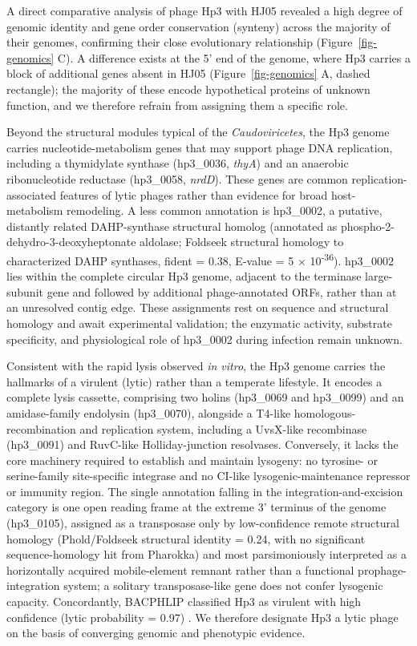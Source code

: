 A direct comparative analysis of phage Hp3 with HJ05 revealed a high
degree of genomic identity and gene order conservation (synteny) across
the majority of their genomes, confirming their close evolutionary
relationship (Figure~\ref{fig-genomics} C). A difference exists
at the 5' end of the genome, where Hp3 carries a block of additional
genes absent in HJ05 (Figure~\ref{fig-genomics} A, dashed rectangle);
the majority of these encode hypothetical proteins of unknown function,
and we therefore refrain from assigning them a specific role.

Beyond the structural modules typical of the \emph{Caudoviricetes}, the
Hp3 genome carries nucleotide-metabolism genes that may support phage
DNA replication, including a thymidylate synthase (hp3\_0036,
\emph{thyA}) and an anaerobic ribonucleotide reductase (hp3\_0058,
\emph{nrdD}). These genes are common replication-associated features of
lytic phages rather than evidence for broad host-metabolism remodeling.
A less common annotation is hp3\_0002, a putative, distantly related
DAHP-synthase structural homolog (annotated as
phospho-2-dehydro-3-deoxyheptonate aldolase; Foldseek structural
homology to characterized DAHP synthases, fident = 0.38, E-value = 5 ×
10\textsuperscript{-36}). hp3\_0002 lies within the complete circular
Hp3 genome, adjacent to the terminase large-subunit gene and followed by
additional phage-annotated ORFs, rather than at an unresolved contig
edge. These assignments rest on sequence and structural homology and
await experimental validation; the enzymatic activity, substrate
specificity, and physiological role of hp3\_0002 during infection remain
unknown.

Consistent with the rapid lysis observed \emph{in vitro}, the Hp3 genome
carries the hallmarks of a virulent (lytic) rather than a temperate
lifestyle. It encodes a complete lysis cassette, comprising two holins (hp3\_0069 and
hp3\_0099) and an amidase-family endolysin (hp3\_0070), alongside a
T4-like homologous-recombination and replication system, including a
UvsX-like recombinase (hp3\_0091) and RuvC-like Holliday-junction
resolvases. Conversely, it lacks the core machinery required to establish
and maintain lysogeny: no tyrosine- or serine-family site-specific
integrase and no CI-like lysogenic-maintenance repressor or immunity
region. The single annotation falling in the integration-and-excision
category is one open reading frame at the extreme 3' terminus of the
genome (hp3\_0105), assigned as a transposase only by low-confidence remote
structural homology (Phold/Foldseek structural identity = 0.24, with no
significant sequence-homology hit from Pharokka) and most parsimoniously
interpreted as a horizontally acquired mobile-element remnant rather than a
functional prophage-integration system; a solitary transposase-like gene
does not confer lysogenic capacity. Concordantly, BACPHLIP classified Hp3
as virulent with high confidence (lytic probability = 0.97)
\citep{2021-BACPHLIP_Hockenberry}. We therefore designate Hp3 a lytic phage
on the basis of converging genomic and phenotypic evidence.

